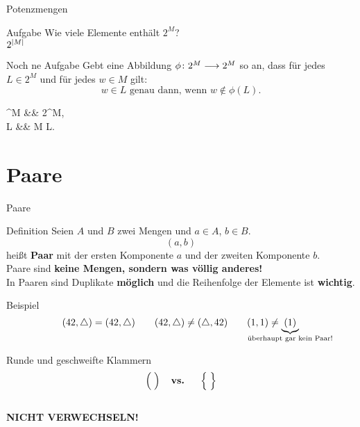 \begin{frame}{Potenzmengen}
	\begin{block}{Aufgabe}
		Wie viele Elemente enthält $2^M$? \\[0.5em]
		
		\pause
		$2^{\left\lvert M \right\rvert}$
	\end{block}
	
	\pause
	\begin{block}{Noch ne Aufgabe}
		Gebt eine Abbildung $\phi \colon 2^{M} \longrightarrow 2^{M}$ so an,
		dass für jedes $L \in 2^{M}$ und für jedes $w \in M$ gilt:
		\begin{equation*}
			w \in L \text{ genau dann, wenn } w \notin \phi(L).
		\end{equation*}
		
		\pause
		\begin{threealign}
			\phi {}^{M} &\functionto& 2^{M},\\
			L &\mapsto& M \setminus L.
		\end{threealign}
	\end{block}
\end{frame}

\section{Paare}

\begin{frame}{Paare}
	\begin{block}{Definition}
		Seien $A$ und $B$ zwei Mengen und $a \in A$, $b \in B$.\\
		$$(a, b)$$ heißt \textbf{Paar} mit der ersten Komponente $a$ und der zweiten Komponente $b$.\\[1em]
		\pause
		Paare sind \textbf{keine Mengen, sondern was \alert{völlig anderes}!} \\
		In Paaren sind Duplikate \textbf{möglich} und die Reihenfolge der Elemente ist \textbf{wichtig}.\\
	\end{block}

	\pause
	\begin{exampleblock}{Beispiel}
		$$ (42, \triangle) = (42, \triangle) \qquad (42, \triangle) \neq (\triangle, 42) \qquad (1, 1) \neq \underbrace{(1)}_{\mathclap{\text{überhaupt gar kein Paar!}}} $$
	\end{exampleblock}
\end{frame}

\begin{frame}
	\centering
	\Huge
	\alert{Runde und geschweifte Klammern 
		   $$\Big(\;\Big) \textbf{\quad vs. \quad} \Big\{\;\Big\}$$ \\
		   \textbf{NICHT VERWECHSELN!}}
\end{frame}

